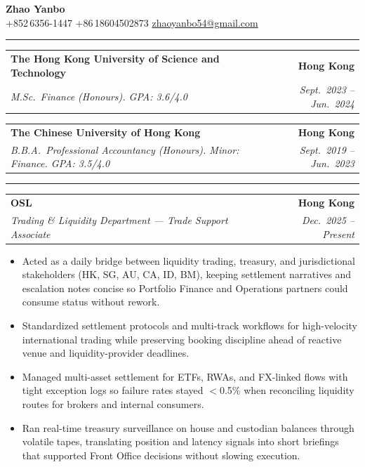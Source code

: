 \documentclass[9pt,a4paper]{extarticle}
\makeatletter
\newcommand{\ressection}[1]{%
  \vspace{0.8em}%
  \noindent{\large\scshape\bfseries #1}\par\nobreak
  \vspace{-\parskip}%
  \vspace{-\parskip}%
  \vspace{-\parskip}%
  \vspace{-\parskip}%
  \noindent\rule{\linewidth}{0.1pt}\par\nobreak
  \vspace{-\parskip}%
}
\newcommand{\resumeSubheading}[4]{%
  \vspace{0.6em}%
  \begin{tabular*}{\textwidth}{l@{\extracolsep{\fill}}r}
    \textbf{#1} & \textbf{#2} \\
    \textit{\small #3} & \textit{\small #4} \\
  \end{tabular*}\vspace{0.32em}}
\makeatother
\begin{document}
\begin{center}
  {\LARGE\bfseries Zhao Yanbo}\\[0.35em]
  \small
  +852\,6356-1447 \;\textbar\;
  +86\,18604502873 \;\textbar\;
  \href{mailto:zhaoyanbo54@gmail.com}{zhaoyanbo54@gmail.com}
\end{center}
\vspace{-0.2em}

\ressection{Education}

\resumeSubheading{The Hong Kong University of Science and Technology}{Hong Kong}{M.Sc.\ Finance (Honours). GPA: 3.6/4.0}{Sept.\ 2023 -- Jun.\ 2024}

\resumeSubheading{The Chinese University of Hong Kong}{Hong Kong}{B.B.A.\ Professional Accountancy (Honours). Minor: Finance. GPA: 3.5/4.0}{Sept.\ 2019 -- Jun.\ 2023}

\ressection{Work Experience}

\resumeSubheading{OSL}{Hong Kong}{Trading \& Liquidity Department --- Trade Support Associate}{Dec.\ 2025 -- Present}
\begin{itemize}
  \item Acted as a daily bridge between liquidity trading, treasury, and jurisdictional stakeholders (HK, SG, AU, CA, ID, BM), keeping settlement narratives and escalation notes concise so Portfolio Finance and Operations partners could consume status without rework.
  \item Standardized settlement protocols and multi-track workflows for high-velocity international trading while preserving booking discipline ahead of reactive venue and liquidity-provider deadlines.
  \item Managed multi-asset settlement for ETFs, RWAs, and FX-linked flows with tight exception logs so failure rates stayed $<$0.5\% when reconciling liquidity routes for brokers and internal consumers.
  \item Ran real-time treasury surveillance on house and custodian balances through volatile tapes, translating position and latency signals into short briefings that supported Front Office decisions without slowing execution.
\end{itemize}
\end{document}
